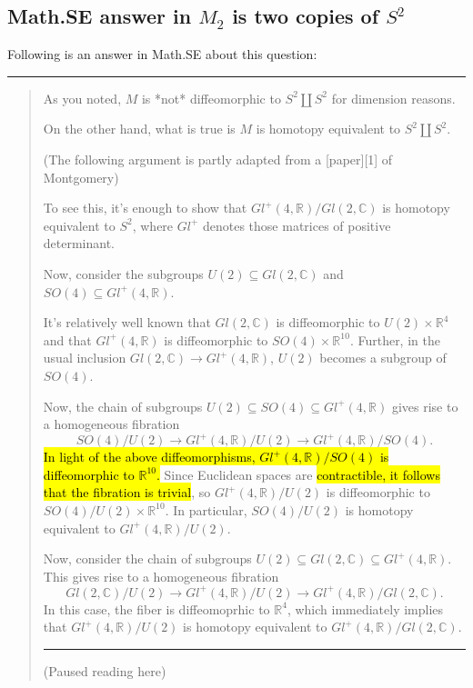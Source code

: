 \documentclass{article}
\numberwithin{equation}{subsection} %
\theoremstyle{definition}
\begin{document}
    \subsection{Math.SE answer in \texorpdfstring{$M_2$}{} is two copies of \texorpdfstring{$S^2$}{}}

    Following is an answer\cite{math.se_set-of-almost}
    in Math.SE about this question:
    \begin{center}\noindent\rule{8cm}{0.4pt}\end{center}
    \begin{quote}
        As you noted, $M$ is *not* diffeomorphic to $S^2\coprod S^2$ for
        dimension reasons.

        On the other hand, what is true is $M$ is homotopy equivalent to $S^2
        \coprod S^2$.

        (The following argument is partly adapted from a [paper][1] of
        Montgomery)

        To see this, it's enough to show that
        $Gl^+(4,\mathbb{R})/Gl(2,\mathbb{C})$ is homotopy equivalent to $S^2$,
        where $Gl^+$ denotes those matrices of positive determinant.

        Now, consider the subgroups $U(2)\subseteq Gl(2,\mathbb{C})$ and
        $SO(4)\subseteq Gl^+(4,\mathbb{R})$.

        It's relatively well known that $Gl(2,\mathbb{C})$ is diffeomorphic to
        $U(2)\times \mathbb{R}^4$ and that $Gl^+(4,\mathbb{R})$ is diffeomorphic
        to $SO(4)\times \mathbb{R}^{10}$.  Further, in the usual inclusion
        $Gl(2,\mathbb{C})\rightarrow Gl^+(4,\mathbb{R})$, $U(2)$ becomes a
        subgroup of $SO(4)$.

        Now, the chain of subgroups $U(2)\subseteq SO(4)\subseteq
        Gl^+(4,\mathbb{R})$ gives rise to a homogeneous fibration
        $$SO(4)/U(2)\rightarrow Gl^+(4,\mathbb{R})/U(2)\rightarrow
        Gl^+(4,\mathbb{R})/SO(4).$$  \hl{In light of the above diffeomorphisms,
        $Gl^+(4,\mathbb{R})/SO(4)$ is diffeomorphic to $\mathbb{R}^{10}$.}
        Since Euclidean spaces are \hl{contractible, it follows that the
        fibration is trivial}, so $Gl^+(4,\mathbb{R})/U(2)$ is diffeomorphic to
        $SO(4)/U(2)\times \mathbb{R}^{10}$.  In particular, $SO(4)/U(2)$ is
        homotopy equivalent to $Gl^+(4,\mathbb{R})/U(2)$.

        Now, consider the chain of subgroups $U(2)\subseteq
        Gl(2,\mathbb{C})\subseteq Gl^+(4,\mathbb{R})$.  This gives rise to a
        homogeneous fibration $$Gl(2,\mathbb{C})/U(2)\rightarrow
        Gl^+(4,\mathbb{R})/U(2) \rightarrow
        Gl^+(4,\mathbb{R})/Gl(2,\mathbb{C}).$$  In this case, the fiber is
        diffeomoprhic to $\mathbb{R}^4$, which immediately implies that
        $Gl^+(4,\mathbb{R})/U(2)$ is homotopy equivalent to
        $Gl^+(4,\mathbb{R})/Gl(2,\mathbb{C})$.
        \begin{center}\noindent\rule{8cm}{0.4pt}
            (Paused reading here)
        \end{center}


\end{quote}
\end{document}
